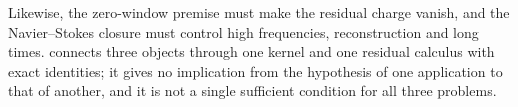 Likewise, the zero-window premise must make the residual charge vanish,
and the Navier--Stokes closure must control high frequencies,
reconstruction and long times.  
connects three objects through one kernel and one residual calculus
with exact identities; it gives no implication from the hypothesis of
one application to that of another, and it is not a single sufficient
condition for all three problems.

